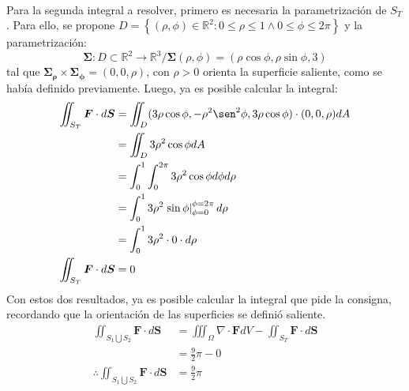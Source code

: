 \begin{solution}
\begin{align*}
    \end{align*}
    Para la segunda integral a resolver, primero es necesaria la parametrización de $S_T$. Para ello, se propone 
    $D=\left\{(\rho,\phi) \in \mathbb{R}^2 : 0\leq\rho\leq1 \land 0\leq\phi\leq2\pi\right\}$ y la parametrización:
    \begin{equation*}
        \boldsymbol{\Sigma} : D \subset \mathbb{R}^2 \longrightarrow \mathbb{R}^3 / \boldsymbol{\Sigma}(\rho,\phi) = \left(\rho\cos{\phi},\rho\sin{\phi},3\right)
    \end{equation*}
    tal que $\boldsymbol{\Sigma_{\rho}}\times\boldsymbol{\Sigma_{\phi}} = \left(0,0,\rho\right)$, con $\rho>0$ orienta la superficie saliente, como se había definido previamente.
    Luego, ya es posible calcular la integral:
    \begin{align*}
        \iint_{S_T} \boldsymbol{F} \cdot d\boldsymbol{S} &= \iint_{D} (3\rho\cos{\phi},-\rho^2\sen^2{\phi},3\rho\cos{\phi}) \cdot (0,0,\rho)dA\\
        &= \iint_{D} 3\rho^2\cos{\phi}dA\\
        &= \int_{0}^{1} \int_{0}^{2\pi} 3\rho^2\cos{\phi} d\phi d\rho\\
        &= \int_{0}^{1} 3\rho^2\left.\sin{\phi}\right|_{\phi=0}^{\phi=2\pi} d\rho \\
        &= \int_{0}^{1} 3\rho^2\cdot 0 \cdot d\rho\\
        \iint_{S_T} \boldsymbol{F} \cdot d\boldsymbol{S} &= 0 \\
    \end{align*}
    Con estos dos resultados, ya es posible calcular la integral que pide la consigna, recordando que la orientación de las superficies se definió saliente.
    \begin{align*}
        \iint_{S_1 \bigcup S_2} \boldsymbol{F} \cdot d\boldsymbol{S} &= \iiint_{\Omega} \nabla \cdot \boldsymbol{F} dV - \iint_{S_T} \boldsymbol{F} \cdot d\boldsymbol{S}\\
        &= \frac{9}{2}\pi - 0\\
        \therefore \iint_{S_1 \bigcup S_2} \boldsymbol{F} \cdot d\boldsymbol{S} &= \frac{9}{2}\pi
    \end{align*}
\end{solution}


